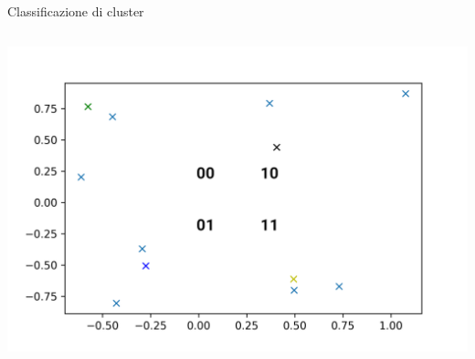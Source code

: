 \documentclass{beamer}
\begin{document}
\begin{frame}{Classificazione di cluster}
\begin{columns}
            \includegraphics[width=\columnwidth]{gfx/Clusters/random_numbered.png}            
        \end{columns}
    \end{frame}
\end{document}
